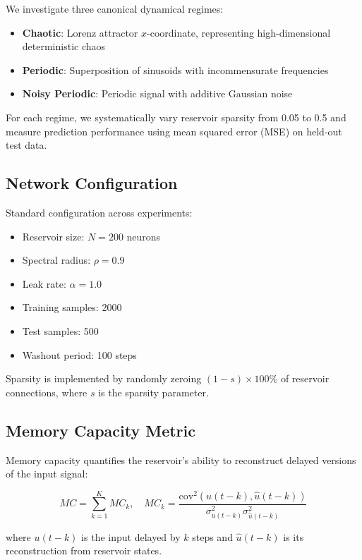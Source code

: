 \documentclass[11pt,a4paper]{article}
\begin{document}
We investigate three canonical dynamical regimes:

\begin{itemize}
    \item \textbf{Chaotic}: Lorenz attractor $x$-coordinate, representing high-dimensional deterministic chaos
    \item \textbf{Periodic}: Superposition of sinusoids with incommensurate frequencies
    \item \textbf{Noisy Periodic}: Periodic signal with additive Gaussian noise
\end{itemize}

For each regime, we systematically vary reservoir sparsity from 0.05 to 0.5 and measure prediction performance using mean squared error (MSE) on held-out test data.

\subsection{Network Configuration}

Standard configuration across experiments:
\begin{itemize}
    \item Reservoir size: $N = 200$ neurons
    \item Spectral radius: $\rho = 0.9$
    \item Leak rate: $\alpha = 1.0$
    \item Training samples: 2000
    \item Test samples: 500
    \item Washout period: 100 steps
\end{itemize}

Sparsity is implemented by randomly zeroing $(1-s) \times 100\%$ of reservoir connections, where $s$ is the sparsity parameter.

\subsection{Memory Capacity Metric}

Memory capacity \citep{jaeger2002short} quantifies the reservoir's ability to reconstruct delayed versions of the input signal:

\begin{equation}
MC = \sum_{k=1}^{K} MC_k, \quad MC_k = \frac{\text{cov}^2(u(t-k), \hat{u}(t-k))}{\sigma^2_{u(t-k)}\sigma^2_{\hat{u}(t-k)}}
\end{equation}

where $u(t-k)$ is the input delayed by $k$ steps and $\hat{u}(t-k)$ is its reconstruction from reservoir states.
\end{document}
